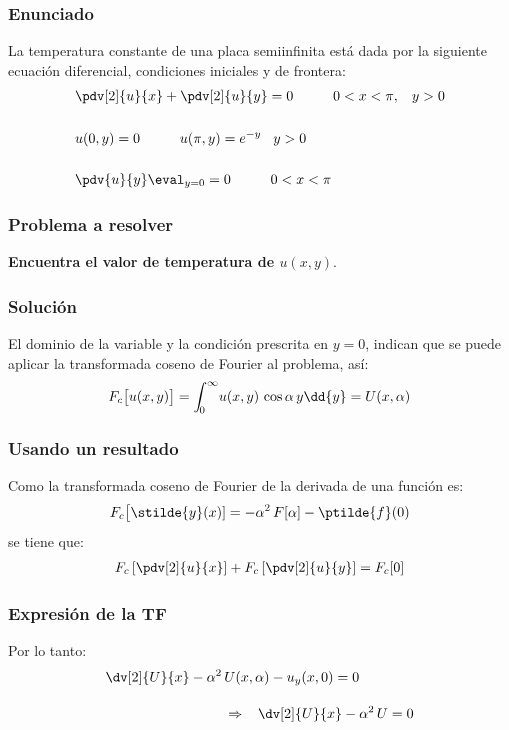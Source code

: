 \begin{frame}
\frametitle{Enunciado}
La temperatura constante de una placa semiinfinita está dada por la siguiente ecuación diferencial, condiciones iniciales y de frontera:
\begin{align*}
&\pdv[2]{u}{x} + \pdv[2]{u}{y} = 0 \hspace{1cm} 0 < x < \pi, \hspace{0.3cm} y > 0 \\[0.5cm]
&u(0, y) = 0 \hspace{1cm} u(\pi, y) = e^{-y} \hspace{0.3cm} y > 0 \\[0.5cm]
&\pdv{u}{y} \eval_{y=0} = 0 \hspace{1cm} 0 < x < \pi
\end{align*}
\end{frame}
\begin{frame}
\frametitle{Problema a resolver}
\textbf{Encuentra el valor de temperatura de $u(x,y)$}.
\end{frame}
\begin{frame}
\frametitle{Solución}
El dominio de la variable y la condición prescrita en $y = 0$, indican que se puede aplicar la transformada coseno de Fourier al problema, así:
\begin{align*}
F_{c} \big[u(x,y)\big] = \scaleint{5ex}_{\bs 0}^{\infty} u(x, y) \, \cos \alpha \, y \dd{y} = U(x, \alpha)
\end{align*}
\end{frame}
\begin{frame}
\frametitle{Usando un resultado}
Como la transformada coseno de Fourier de la derivada de una función es:
\begin{align*}
F_{c} \big[\stilde{y}(x)] = - \alpha^{2} \, F[\alpha] - \ptilde{f} (0)
\end{align*}
se tiene que:
\begin{align*}
F_{c} \left[\pdv[2]{u}{x} \right] + F_{c} \left[\pdv[2]{u}{y} \right] = F_{c} [0]
\end{align*}
\end{frame}
\begin{frame}
\frametitle{Expresión de la TF}
Por lo tanto:
\begin{align*}
\dv[2]{U}{x} - \alpha^{2} \, &U(x, \alpha) - u_{y} (x, 0) = 0 \\[1em]
&\Rightarrow \hspace{0.3cm} \dv[2]{U}{x} - \alpha^{2} \, U = 0
\end{align*}
\end{frame}
